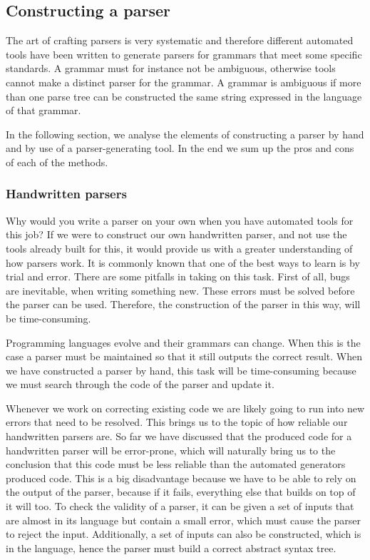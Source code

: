 \subsection{Constructing a parser}
\label{subsec:constructingaparser}
The art of crafting parsers is very systematic and therefore different automated
tools have been written to generate parsers for grammars that meet some specific
standards. A grammar must for instance not be ambiguous, otherwise tools cannot
make a distinct parser for the grammar. A grammar is ambiguous if more than
one parse tree can be constructed the same string expressed in the language of
that grammar.

In the following section, we analyse the elements of constructing a parser by
hand and by use of a parser-generating tool. In the end we sum up the pros and
cons of each of the methods. 

\subsubsection{Handwritten parsers}
\label{subsec:handwrittenparsers}
Why would you write a parser on your own when you have automated tools for this
job? If we were to construct our own handwritten parser, and not use the tools
already built for this, it would provide us with a greater understanding of how
parsers work. It is commonly known that one of the best ways to learn is by
trial and error. There are some pitfalls in taking on this task. First of all,
bugs are inevitable, when writing something new. These errors must be solved
before the parser can be used. Therefore, the construction of the parser in this
way, will be time-consuming.

Programming languages evolve and their grammars can change. When this is the
case a parser must be maintained so that it still outputs the correct result.
When we have constructed a parser by hand, this task will be time-consuming
because we must search through the code of the parser and update it.

Whenever we work on correcting existing code we are likely going to run into new
errors that need to be resolved. This brings us to the topic of how reliable our
handwritten parsers are. So far we have discussed that the produced code for a
handwritten parser will be error-prone, which will naturally bring us to the
conclusion that this code must be less reliable than the automated generators
produced code. This is a big disadvantage because we have to be able to rely on
the output of the parser, because if it fails, everything else that builds on
top of it will too. To check the validity of a parser, it can be given a set of
inputs that are almost in its language but contain a small error, which must
cause the parser to reject the input. Additionally, a set of inputs can also be
constructed, which is in the language, hence the parser must build a correct
abstract syntax tree.

